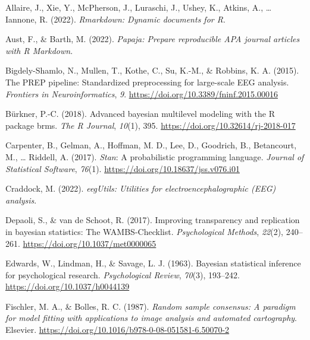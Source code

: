 \documentclass[
  man,floatsintext]{apa6}
\newlength{\cslhangindent}
\newlength{\cslentryspacingunit} %
\newenvironment{CSLReferences}[2] %
 {%
  \setlength{\parindent}{0pt}
  \ifodd #1
  \let\oldpar\par
  \def\par{\hangindent=\cslhangindent\oldpar}
  \fi
  \setlength{\parskip}{#2\cslentryspacingunit}
 }%
 {}
\begin{document}
\hypertarget{refs}{}
\begin{CSLReferences}{1}{0}
\leavevmode{}%
Allaire, J., Xie, Y., McPherson, J., Luraschi, J., Ushey, K., Atkins, A., \ldots{} Iannone, R. (2022). \emph{Rmarkdown: {Dynamic} documents for {R}}.

\leavevmode{}%
Aust, F., \& Barth, M. (2022). \emph{Papaja: {Prepare} reproducible {APA} journal articles with {R Markdown}}.

\leavevmode{}%
Bigdely-Shamlo, N., Mullen, T., Kothe, C., Su, K.-M., \& Robbins, K. A. (2015). The {PREP} pipeline: Standardized preprocessing for large-scale {EEG} analysis. \emph{Frontiers in Neuroinformatics}, \emph{9}. \url{https://doi.org/10.3389/fninf.2015.00016}

\leavevmode{}%
Bürkner, P.-C. (2018). Advanced bayesian multilevel modeling with the {R} package brms. \emph{The R Journal}, \emph{10}(1), 395. \url{https://doi.org/10.32614/rj-2018-017}

\leavevmode{}%
Carpenter, B., Gelman, A., Hoffman, M. D., Lee, D., Goodrich, B., Betancourt, M., \ldots{} Riddell, A. (2017). {\emph{Stan}}: {A} probabilistic programming language. \emph{Journal of Statistical Software}, \emph{76}(1). \url{https://doi.org/10.18637/jss.v076.i01}

\leavevmode{}%
Craddock, M. (2022). \emph{{eegUtils}: {Utilities} for electroencephalographic ({EEG}) analysis}.

\leavevmode{}%
Depaoli, S., \& van de Schoot, R. (2017). Improving transparency and replication in bayesian statistics: {The WAMBS-Checklist}. \emph{Psychological Methods}, \emph{22}(2), 240--261. \url{https://doi.org/10.1037/met0000065}

\leavevmode{}%
Edwards, W., Lindman, H., \& Savage, L. J. (1963). Bayesian statistical inference for psychological research. \emph{Psychological Review}, \emph{70}(3), 193--242. \url{https://doi.org/10.1037/h0044139}

\leavevmode{}%
Fischler, M. A., \& Bolles, R. C. (1987). \emph{Random sample consensus: A paradigm for model fitting with applications to image analysis and automated cartography}. Elsevier. \url{https://doi.org/10.1016/b978-0-08-051581-6.50070-2}


\end{CSLReferences}
\end{document}

